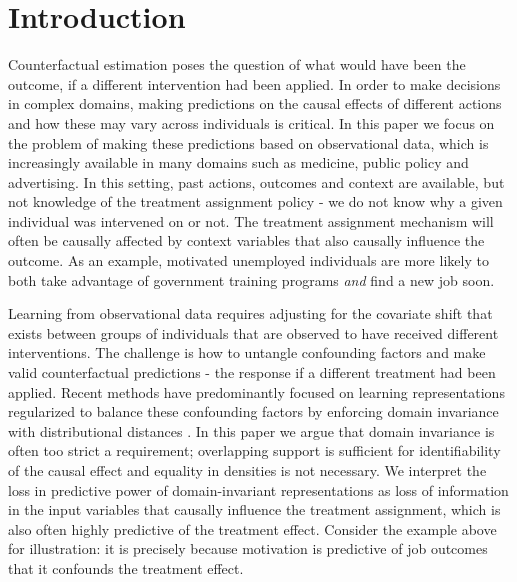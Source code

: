 \documentclass[twoside]{article}
\begin{document}
\section{Introduction}
Counterfactual estimation poses the question of what would have been the outcome, if a different intervention had been applied. In order to make decisions in complex domains, making predictions on the causal effects of different actions and how these may vary across individuals is critical. In this paper we focus on the problem of making these predictions based on observational data, which is increasingly available in many domains such as medicine, public policy and advertising. In this setting, past actions, outcomes and context are available, but not knowledge of the treatment assignment policy - we do not know why a given individual was intervened on or not. The treatment assignment mechanism will often be causally affected by context variables that also causally influence the outcome. As an example, motivated unemployed individuals are more likely to both take advantage of government training programs \textit{and} find a new job soon. 

Learning from observational data requires adjusting for the covariate shift that exists between groups of individuals that are observed to have received different interventions. The challenge is how to untangle confounding factors and make valid counterfactual predictions - the response if a different treatment had been applied. Recent methods have predominantly focused on learning representations regularized to balance these confounding factors by enforcing domain invariance with distributional distances \cite{johansson2016learning,johansson2018learning,yao2018representation}. In this paper we argue that domain invariance is often too strict a requirement; overlapping support is sufficient for identifiability of the causal effect and equality in densities is not necessary. We interpret the loss in predictive power of domain-invariant representations as loss of information in the input variables that causally influence the treatment assignment, which is also often highly predictive of the treatment effect. Consider the example above for illustration: it is precisely because motivation is predictive of job outcomes that it confounds the treatment effect.

\end{document}
